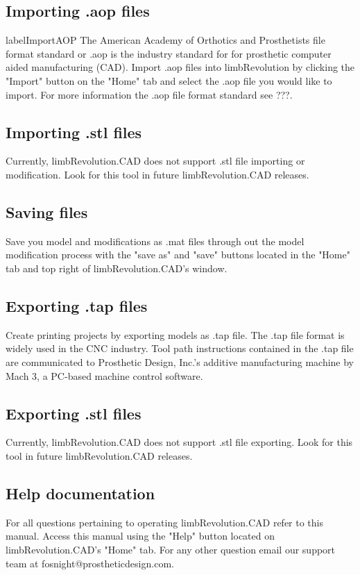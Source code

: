 \documentclass[twoside,a4paper]{refrep}
\begin{document}
	\subsection{Importing .aop files}
	label{ImportAOP}
	The American Academy of Orthotics and Prosthetists file format standard or .aop is the industry standard for for prosthetic computer aided manufacturing (CAD). Import .aop files into limbRevolution by clicking the "Import" button on the "Home" tab and select the .aop file you would like to import. For more information the .aop file format standard see ???.
	\subsection{Importing .stl files}
	\label{ImporSTL}
	Currently, limbRevolution.CAD does not support .stl file importing or modification. Look for this tool in future limbRevolution.CAD releases.
	\subsection{Saving files}
	\label{Save}
	Save you model and modifications as .mat files through out the model modification process with the "save as" and "save" buttons located in the "Home" tab and top right of limbRevolution.CAD's window.
	\subsection{Exporting .tap files}
	\label{ExportTAP}
	Create printing projects by exporting models as .tap file. The .tap file format is widely used in the CNC industry. Tool path instructions contained in the .tap file are communicated to Prosthetic Design, Inc.'s additive manufacturing machine by Mach 3, a PC-based machine control software.
	\subsection{Exporting .stl files}
	\label{ExportSTL}
	Currently, limbRevolution.CAD does not support .stl file exporting. Look for this tool in future limbRevolution.CAD releases.
	\subsection{Help documentation}
	\label{Help}
	For all questions pertaining to operating limbRevolution.CAD refer to this manual. Access this manual using the "Help" button located on limbRevolution.CAD's "Home" tab. For any other question email our support team at fosnight@prostheticdesign.com.
\end{document}
